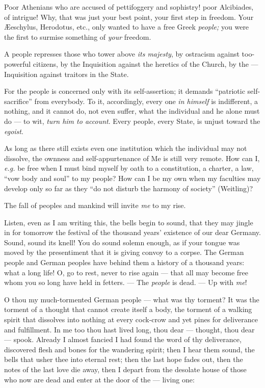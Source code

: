 Poor Athenians who are accused of pettifoggery and sophistry! poor Alcibiades, 
of intrigue! Why, that was just your best point, your first step in freedom. 
Your \AE{}eschylus, Herodotus, etc., only wanted to have a free Greek 
\textit{people;} you were the first to surmise something of \textit{your} 
freedom.

A people represses those who tower above \textit{its majesty}, by ostracism 
against too-powerful citizens, by the Inquisition against the heretics of the 
Church, by the --- Inquisition against traitors in the State.

For the people is concerned only with its self-assertion; it demands 
``patriotic self-sacrifice'' from everybody. To it, accordingly, every one 
\textit{in himself} is indifferent, a nothing, and it cannot do, not even 
suffer, what the individual and he alone must do --- to wit, \textit{turn him 
to account}. Every people, every State, is unjust toward the \textit{egoist}.

As long as there still exists even one institution which the individual may 
not dissolve, the ownness and self-appurtenance of Me is still very remote. 
How can I, \textit{e.g.} be free when I must bind myself by oath to a 
constitution, a charter, a law, ``vow body and soul'' to my people? How can 
I be my own when my faculties may develop only so far as they ``do not 
disturb the harmony of society'' (Weitling)?

The fall of peoples and mankind will invite \textit{me} to my rise.

Listen, even as I am writing this, the bells begin to sound, that they may 
jingle in for tomorrow the festival of the thousand years' existence of our 
dear Germany. Sound, sound its knell! You do sound solemn enough, as if your 
tongue was moved by the presentiment that it is giving convoy to a corpse. The 
German people and German peoples have behind them a history of a thousand 
years: what a long life! O, go to rest, never to rise again --- that all may 
become free whom you so long have held in fetters. --- The \textit{people} is 
dead. --- Up with \textit{me}!

O thou my much-tormented German people --- what was thy torment? It was the 
torment of a thought that cannot create itself a body, the torment of a 
walking spirit that dissolves into nothing at every cock-crow and yet pines 
for deliverance and fulfillment. In me too thou hast lived long, thou dear --- thought, thou dear --- spook. Already I almost fancied I had found the word of 
thy deliverance, discovered flesh and bones for the wandering spirit; then I 
hear them sound, the bells that usher thee into eternal rest; then the last 
hope fades out, then the notes of the last love die away, then I depart from 
the desolate house of those who now are dead and enter at the door of the --- living one:

